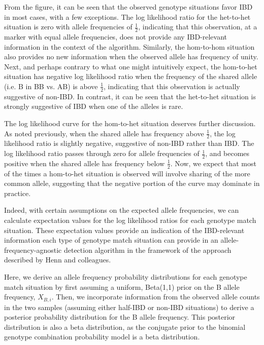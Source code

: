 \documentclass{article}
\begin{document}
From the figure, it can be seen that the observed genotype situations favor IBD in most cases, with a few exceptions. The log likelihood ratio for the het-to-het situation is zero with allele frequencies of $\frac{1}{2}$, indicating that this observation, at a marker with equal allele frequencies, does not provide any IBD-relevant information in the context of the algorithm. Similarly, the hom-to-hom situation also provides no new information when the observed allele has frequency of unity. Next, and perhaps contrary to what one might intuitively expect, the hom-to-het situation has negative log likelihood ratio when the frequency of the shared allele (i.e. B in BB vs. AB) is above $\frac{1}{2}$, indicating that this observation is actually suggestive of non-IBD. In contrast, it can be seen that the het-to-het situation is strongly suggestive of IBD when one of the alleles is rare.

The log likelihood curve for the hom-to-het situation deserves further discussion. As noted previously, when the shared allele has frequency above $\frac{1}{2}$, the log likelihood ratio is slightly negative, suggestive of non-IBD rather than IBD. The log likelihood ratio passes through zero for allele frequencies of $\frac{1}{2}$, and becomes positive when the shared allele has frequency below $\frac{1}{2}$. Now, we expect that most of the times a hom-to-het situation is observed will involve sharing of the more common allele, suggesting that the negative portion of the curve may dominate in practice. 

Indeed, with certain assumptions on the expected allele frequencies, we can calculate expectation values for the log likelihood ratios for each genotype match situation. These expectation values provide an indication of the IBD-relevant information each type of genotype match situation can provide in an allele-frequency-agnostic detection algorithm in the framework of the approach described by Henn and colleagues.

Here, we derive an allele frequency probability distributions for each genotype match situation by first assuming a uniform, Beta(1,1) prior on the B allele frequency, $X_{B,i}$. Then, we incorporate information from the observed allele counts in the two samples (assuming either half-IBD or non-IBD situations) to derive a posterior probability distribution for the B allele frequency. This posterior distribution is also a beta distribution, as the conjugate prior to the binomial genotype combination probability model is a beta distribution.
\end{document}
